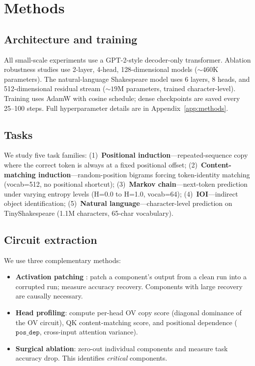 \documentclass[final]{article}
\begin{document}
\section{Methods}
\label{sec:methods}

\subsection{Architecture and training}

All small-scale experiments use a GPT-2-style decoder-only transformer.
Ablation robustness studies use 2-layer, 4-head, 128-dimensional models
(${\sim}460$K parameters). The natural-language Shakespeare model uses 6 layers,
8 heads, and 512-dimensional residual stream (${\sim}19$M parameters, trained
character-level). Training uses AdamW with cosine schedule; dense checkpoints
are saved every 25--100 steps. Full hyperparameter details are in
Appendix~\ref{app:methods}.

\subsection{Tasks}

We study five task families: (1)~\textbf{Positional induction}---repeated-sequence
copy where the correct token is always at a fixed positional offset; (2)~\textbf{Content-matching
induction}---random-position bigrams forcing token-identity matching (vocab=512,
no positional shortcut); (3)~\textbf{Markov chain}---next-token prediction under
varying entropy levels (H=0.0 to H=1.0, vocab=64); (4)~\textbf{IOI}---indirect
object identification; (5)~\textbf{Natural language}---character-level prediction
on TinyShakespeare (1.1M characters, 65-char vocabulary).

\subsection{Circuit extraction}

We use three complementary methods:
\begin{itemize}
\item \textbf{Activation patching} \citep{meng2022activation}: patch a
      component's output from a clean run into a corrupted run; measure accuracy
      recovery. Components with large recovery are causally necessary.
\item \textbf{Head profiling}: compute per-head OV copy score (diagonal dominance
      of the OV circuit), QK content-matching score, and positional dependence
      ($\mathtt{pos\_dep}$, cross-input attention variance).
\item \textbf{Surgical ablation}: zero-out individual components and measure
      task accuracy drop. This identifies \emph{critical} components.
\end{itemize}
\end{document}
